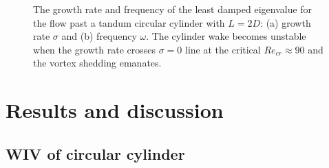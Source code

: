 \begin{figure}
	 \centering
     \caption{The growth rate and frequency of the least damped eigenvalue for the 
                flow past a tandum circular cylinder with $L=2D$: 
                (a) growth rate $\sigma$ and
                (b) frequency $\omega$.  The cylinder wake becomes unstable when 
                the growth rate crosses $\sigma=0$ line at the critical 
                $Re_{cr} \approx 90$ and the vortex shedding emanates. }
\label{fig:fomeig}
\end{figure}



\section{Results and discussion}\label{sec:Results}
\subsection{WIV of circular cylinder}\label{sec:WIV_circular}


